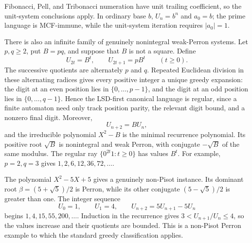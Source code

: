 \begin{example}
  \label{ex:pisot-unit-nonunit}
  Fibonacci, Pell, and Tribonacci numeration have unit trailing
  coefficient, so the unit-system conclusions apply. In ordinary base
  \(b\), \(U_n=b^n\) and \(a_0=b\); the prime language is MCF-immune,
  while the unit-system iteration requires \(\lvert a_0\rvert=1\).

  There is also an infinite family of genuinely nonintegral weak-Perron
  systems. Let \(p,q\ge2\), put \(B=pq\), and suppose that \(B\) is not a
  square. Define
  \[
    U_{2t}=B^t,\qquad U_{2t+1}=pB^t\qquad(t\ge0).
  \]
  The successive quotients are alternately \(p\) and \(q\). Repeated
  Euclidean division in these alternating radices gives every positive
  integer a unique greedy expansion: the digit at an even position lies
  in \(\{0,\ldots,p-1\}\), and the digit at an odd position lies in
  \(\{0,\ldots,q-1\}\). Hence the LSD-first canonical language is regular,
  since a finite automaton need only track position parity, the relevant
  digit bound, and a nonzero final digit. Moreover,
  \[
    U_{n+2}=BU_n,
  \]
  and the irreducible polynomial \(X^2-B\) is the minimal recurrence
  polynomial. Its positive root \(\sqrt B\) is nonintegral and weak Perron,
  with conjugate \(-\sqrt B\) of the same modulus. The regular ray
  \(\{0^{2t}1:t\ge0\}\) has values \(B^t\). For example, \(p=2,q=3\)
  gives \(1,2,6,12,36,72,\ldots\).

  The polynomial \(X^2-5X+5\) gives a genuinely non-Pisot instance. Its
  dominant root \(\beta=(5+\sqrt5)/2\) is Perron, while its other conjugate
  \((5-\sqrt5)/2\) is greater than one. The integer sequence
  \[
    U_0=1,\qquad U_1=4,\qquad
    U_{n+2}=5U_{n+1}-5U_n
  \]
  begins \(1,4,15,55,200,\ldots\). Induction in the recurrence gives
  \(3<U_{n+1}/U_n\le4\), so the values increase and their quotients are
  bounded. This is a non-Pisot Perron example to which the standard greedy
  classification applies.
\end{example}

